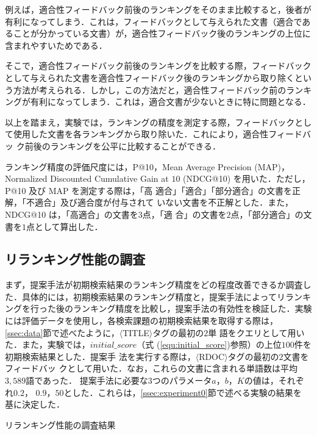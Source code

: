 \documentclass[japanese]{jnlp_1.4}
\begin{document}
例えば，適合性フィードバック前後のランキングをそのまま比較すると，後者が
有利になってしまう．これは，フィードバックとして与えられた文書（適合であ
ることが分かっている文書）が，適合性フィードバック後のランキングの上位に
含まれやすいためである．

そこで，適合性フィードバック前後のランキングを比較する際，フィードバック
として与えられた文書を適合性フィードバック後のランキングから取り除くとい
う方法が考えられる．しかし，この方法だと，適合性フィードバック前のランキ
ングが有利になってしまう．これは，適合文書が少ないときに特に問題となる．

以上を踏まえ，実験では，ランキングの精度を測定する際，フィードバックとし
て使用した文書を各ランキングから取り除いた．これにより，適合性フィードバッ
ク前後のランキングを公平に比較することができる．

ランキング精度の評価尺度には，P@10，Mean Average Precision (MAP)，
Normalized Discounted Cumulative Gain at $10$ (NDCG@10)
\cite{Jarvelin2002} を用いた．ただし，P@10 及び MAP を測定する際は，「高
適合」「適合」「部分適合」の文書を正解，「不適合」及び適合度が付与されて
いない文書を不正解とした．また，NDCG@10 は，「高適合」の文書を$3$点，「適
合」の文書を$2$点，「部分適合」の文書を$1$点として算出した．



\subsection{リランキング性能の調査} \label{ssec:experiment1}

まず，提案手法が初期検索結果のランキング精度をどの程度改善できるか調査し
た．具体的には，初期検索結果のランキング精度と，提案手法によってリランキ
ングを行った後のランキング精度を比較し，提案手法の有効性を検証した．実験
には評価データを使用し，各検索課題の初期検索結果を取得する際は，
\ref{ssec:data}節で述べたように，$\langle$TITLE$\rangle$タグの最初の$2$単
語をクエリとして用いた．また，実験では，$initial\_score$（式
(\ref{equ:initial_score})参照）の上位$100$件を初期検索結果とした．提案手
法を実行する際は，$\langle$RDOC$\rangle$タグの最初の$2$文書をフィードバッ
クとして用いた．なお，これらの文書に含まれる単語数は平均$3,589$語であった．
提案手法に必要な$3$つのパラメータ$a$，$b$，$K$の値は，それぞれ$0.2$，
$0.9$，$50$とした．これらは，\ref{ssec:experiment0}節で述べる実験の結果を
基に決定した．

\begin{table}[b]
\vspace{-0.5\Cvs}
  \caption{リランキング性能の調査結果}
  \label{tbl:experiment1}

\end{table}
\end{document}
